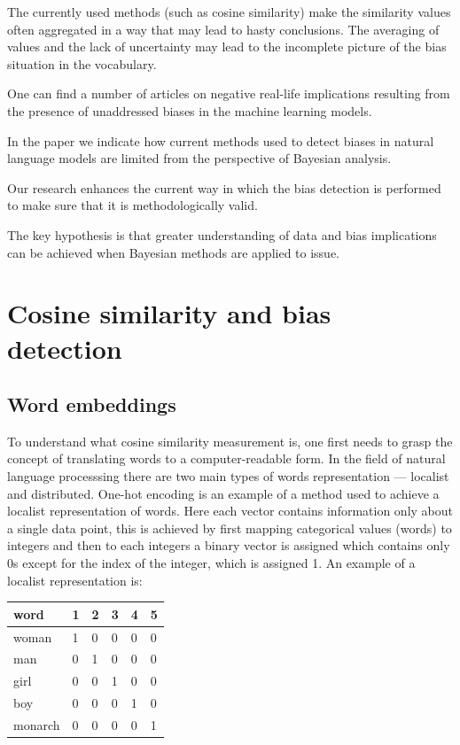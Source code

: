 \documentclass[
  12pt,
]{book}
\begin{document}
The currently used methods (such as cosine similarity) make the similarity values often aggregated in a way that may lead to hasty conclusions. The averaging of values and the lack of uncertainty may lead to the incomplete picture of the bias situation in the vocabulary.

One can find a number of articles on negative real-life implications resulting from the presence of unaddressed biases in the machine learning models.

In the paper we indicate how current methods used to detect biases in natural language models are limited from the perspective of Bayesian analysis.

Our research enhances the current way in which the bias detection is performed to make sure that it is
methodologically valid.

The key hypothesis is that greater understanding of data and bias implications can be achieved when Bayesian methods are applied to issue.

\hypertarget{cosine-similarity-and-bias-detection}{%
\chapter{Cosine similarity and bias detection}\label{cosine-similarity-and-bias-detection}}

\hypertarget{word-embeddings}{%
\section{Word embeddings}\label{word-embeddings}}

To understand what cosine similarity measurement is, one first needs to grasp the concept of translating words to a computer-readable form. In the field of natural language processsing there are two main types of words representation --- localist and distributed. One-hot encoding is an example of a method used to achieve a localist representation of words. Here each vector contains information only about a single data point, this is achieved by first mapping categorical values (words) to integers and then to each integers a binary vector is assigned which contains only 0s except for the index of the integer, which is assigned 1. An example of a localist representation is:

\begin{longtable}[]{@{}llllll@{}}
\toprule
word & 1 & 2 & 3 & 4 & 5 \\
\midrule
\endhead
woman & 1 & 0 & 0 & 0 & 0 \\
man & 0 & 1 & 0 & 0 & 0 \\
girl & 0 & 0 & 1 & 0 & 0 \\
boy & 0 & 0 & 0 & 1 & 0 \\
monarch & 0 & 0 & 0 & 0 & 1 \\
\bottomrule
\end{longtable}
\end{document}

